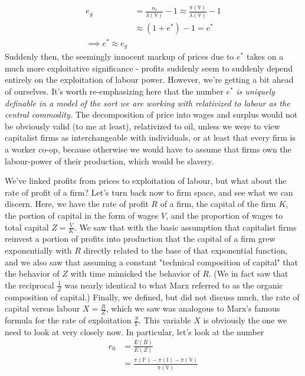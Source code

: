 \begin{align}
	e_g &= \frac{n_l}{\lambda(\mathbb{V})} - 1 \approx \frac{\pi(\mathbb{V})}{\lambda(\mathbb{V})} - 1  \\
		&\approx (1+e^*)-1 = e^* \\
		\implies e^* \approx e_g
\end{align}
Suddenly then, the seemingly innocent markup of prices due to $e^*$ takes on a much more exploitative significance - profits suddenly seem to suddenly depend entirely on the exploitation of labour power. However, we're getting a bit ahead of ourselves. It's worth re-emphasizing here that the number $e^*$ \textit{is uniquely definable in a model of the sort we are working with relativized to labour as the central commodity.} The decomposition of price into wages and surplus would not be obviously valid (to me at least), relativized to oil, unless we were to view capitalist firms as interchangeable with individuals, or at least that every firm is a worker co-op, because otherwise we would have to assume that firms own the labour-power of their production, which would be slavery. \par 
We've linked profits from prices to exploitation of labour, but what about the rate of profit of a firm? Let's turn back now to firm space, and see what we can discern. Here, we have the rate of profit $R$ of a firm, the capital of the firm $K$, the portion of capital in the form of wages $V$, and the proportion of wages to total capital $Z = \frac{V}{K}$. We saw that with the basic assumption that capitalist firms reinvest a portion of profits into production that the capital of a firm grew exponentially with $R$ directly related to the base of that exponential function, and we also saw that assuming a constant "technical composition of capital" that the behavior of $Z$ with time mimicked the behavior of $R$. (We in fact saw that the reciprocal $\frac{1}{Z}$ was nearly identical to what Marx referred to as the organic composition of capital.) Finally, we defined, but did not discuss much, the rate of capital versus labour $X = \frac{R}{Z}$, which we saw was analogous to Marx's famous formula for the rate of exploitation $\frac{S}{V}$. This variable $X$ is obviously the one we need to look at very closely now. In particular, let's look at the number 
\begin{align}
	e_0 &= \frac{E(R)}{E(Z)} \\
	&= \frac{\pi(\mathbb{P}) - \pi(\mathbb{I}) - \pi(\mathbb{V})}{\pi(\mathbb{V})}
\end{align}  
